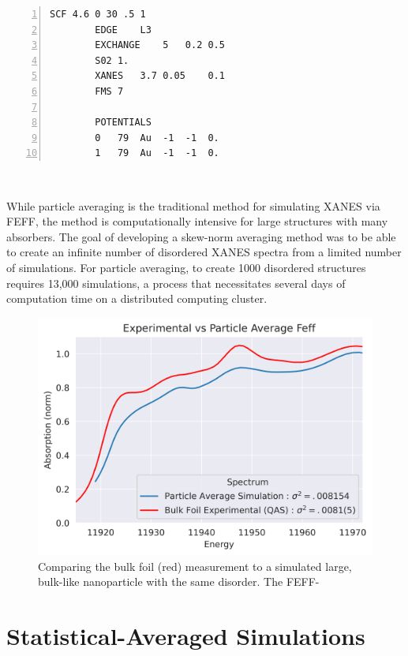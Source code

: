 \vspace{2em}
\begin{minipage}{\linewidth}
	\begin{Verbatim}[samepage=true, numbers=left]
		SCF 4.6 0 30 .5 1
		EDGE    L3
		EXCHANGE    5   0.2 0.5
		S02 1.
		XANES   3.7 0.05    0.1
		FMS 7
	
		POTENTIALS
		0	79	Au	-1	-1	0.
		1	79	Au	-1	-1	0.
	\end{Verbatim}
	~
	\end{minipage}

While particle averaging is the traditional method for simulating XANES via FEFF, the method is computationally intensive for large structures with many absorbers. The goal of developing a skew-norm averaging method was to be able to create an infinite number of disordered XANES spectra from a limited number of simulations. For particle averaging, to create 1000 disordered structures requires 13,000 simulations, a process that necessitates several days of computation time on a distributed computing cluster.



\begin{figure}[h!]
	\centering
	\includegraphics[width=.7\linewidth]{Chapters/Figures/Bulk_experimental_vs_pa_comparison.png}
	\caption[Simulation vs. Experimental 3]{Comparing the bulk foil (red) measurement to a simulated large, bulk-like nanoparticle with the same disorder. The FEFF-}
	\label{fig:avg-experimental-vs-simulation2}
\end{figure}

\section{Statistical-Averaged Simulations}

